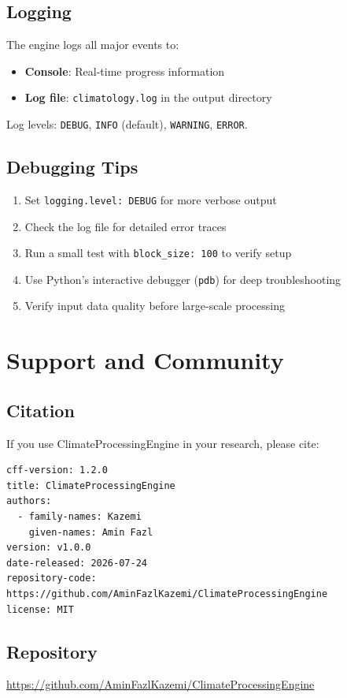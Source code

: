 ﻿\documentclass[12pt,a4paper]{report}
\begin{document}
\section{Logging}
The engine logs all major events to:
\begin{itemize}
    \item \textbf{Console}: Real-time progress information
    \item \textbf{Log file}: \texttt{climatology.log} in the output directory
\end{itemize}
Log levels: \texttt{DEBUG}, \texttt{INFO} (default), \texttt{WARNING}, \texttt{ERROR}.

\section{Debugging Tips}
\begin{enumerate}
    \item Set \texttt{logging.level: DEBUG} for more verbose output
    \item Check the log file for detailed error traces
    \item Run a small test with \texttt{block\_size: 100} to verify setup
    \item Use Python's interactive debugger (\texttt{pdb}) for deep troubleshooting
    \item Verify input data quality before large-scale processing
\end{enumerate}

\chapter{Support and Community}
\section{Citation}
If you use ClimateProcessingEngine in your research, please cite:
\begin{lstlisting}[caption=CITATION.cff]
cff-version: 1.2.0
title: ClimateProcessingEngine
authors:
  - family-names: Kazemi
    given-names: Amin Fazl
version: v1.0.0
date-released: 2026-07-24
repository-code: https://github.com/AminFazlKazemi/ClimateProcessingEngine
license: MIT
\end{lstlisting}

\section{Repository}
\url{https://github.com/AminFazlKazemi/ClimateProcessingEngine}
\end{document}
